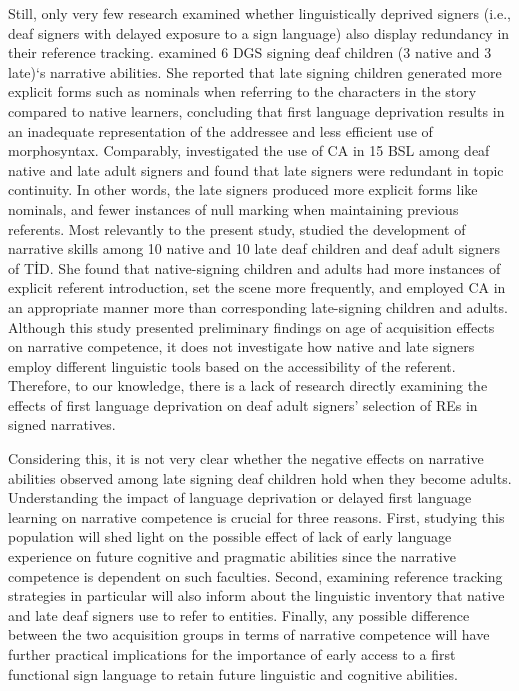 \documentclass[review]{elsarticle} %
\begin{document}
Still, only very few research examined whether linguistically deprived
signers (i.e., deaf signers with delayed exposure to a sign language)
also display redundancy in their reference tracking. \citet{becker2009}
examined 6 DGS signing deaf children (3 native and 3 late)`s narrative
abilities. She reported that late signing children generated more
explicit forms such as nominals when referring to the characters in the
story compared to native learners, concluding that first language
deprivation results in an inadequate representation of the addressee and
less efficient use of morphosyntax. Comparably, \citet{cormier2013}
investigated the use of CA in 15 BSL among deaf native and late adult
signers and found that late signers were redundant in topic continuity.
In other words, the late signers produced more explicit forms like
nominals, and fewer instances of null marking when maintaining previous
referents. Most relevantly to the present study, \citet{gur2018} studied
the development of narrative skills among 10 native and 10 late deaf
children and deaf adult signers of TİD. She found that native-signing
children and adults had more instances of explicit referent
introduction, set the scene more frequently, and employed CA in an
appropriate manner more than corresponding late-signing children and
adults. Although this study presented preliminary findings on age of
acquisition effects on narrative competence, it does not investigate how
native and late signers employ different linguistic tools based on the
accessibility of the referent. Therefore, to our knowledge, there is a
lack of research directly examining the effects of first language
deprivation on deaf adult signers' selection of REs in signed
narratives.

Considering this, it is not very clear whether the negative effects on
narrative abilities observed among late signing deaf children hold when
they become adults. Understanding the impact of language deprivation or
delayed first language learning on narrative competence is crucial for
three reasons. First, studying this population will shed light on the
possible effect of lack of early language experience on future cognitive
and pragmatic abilities since the narrative competence is dependent on
such faculties. Second, examining reference tracking strategies in
particular will also inform about the linguistic inventory that native
and late deaf signers use to refer to entities. Finally, any possible
difference between the two acquisition groups in terms of narrative
competence will have further practical implications for the importance
of early access to a first functional sign language to retain future
linguistic and cognitive abilities.
\end{document}

